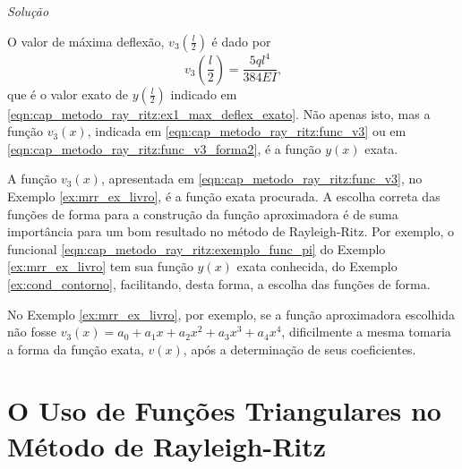 \documentclass[
	12pt,				%
	openright,			%
    twoside,			%
	a4paper,			%
	english,			%
	french,				%
	spanish,			%
	brazil				%
	]{abntex2}
\makeatletter
\renewenvironment{proof}[1][\proofname]{
	\par\pushQED{\qed}%
	\normalfont \topsep6\p@\@plus6\p@\relax
	\trivlist
	\item\relax
		{\itshape
			#1\@addpunct{.}}\hspace\labelsep\ignorespaces
}{%
	\popQED\endtrivlist\@endpefalse
}
\newenvironment{solution}{
	\begin{proof}[Solução]
}{%
	\end{proof}
}
\numberwithin{lema}{chapter}
\numberwithin{teorema}{chapter}
\numberwithin{definicao}{chapter}
\numberwithin{exemplo}{chapter}
\numberwithin{figure}{chapter}
\makeatother
\begin{document}
\begin{solution}
	O valor de máxima deflexão, $v_3(\frac{l}{2})$ é dado por
	$$
		v_3(\frac{l}{2})=\frac{5ql^4}{384EI}
		\text{,}
	$$
	que é o valor exato de $y(\frac{l}{2})$ indicado em \eqref{eqn:cap_metodo_ray_ritz:ex1_max_deflex_exato}. Não apenas isto, mas a função $v_3(x)$, indicada em \eqref{eqn:cap_metodo_ray_ritz:func_v3} ou em \eqref{eqn:cap_metodo_ray_ritz:func_v3_forma2}, é a função $y(x)$ exata.
	
	
\end{solution}

A função $v_3(x)$, apresentada em \eqref{eqn:cap_metodo_ray_ritz:func_v3}, no Exemplo \ref{ex:mrr_ex_livro}, é a função exata procurada. A escolha correta das funções de forma para a construção da função aproximadora é de suma importância para um bom resultado no método de Rayleigh-Ritz. Por exemplo, o funcional \eqref{eqn:cap_metodo_ray_ritz:exemplo_func_pi} do Exemplo \ref{ex:mrr_ex_livro} tem sua função $y(x)$ exata conhecida, do Exemplo \ref{ex:cond_contorno}, facilitando, desta forma, a escolha das funções de forma.

No Exemplo \ref{ex:mrr_ex_livro}, por exemplo, se a função aproximadora escolhida não fosse $v_3(x)=a_0+a_1x+a_2x^2+a_3x^3+a_4x^4$, dificilmente a mesma tomaria a forma da função exata, $v(x)$, após a determinação de seus coeficientes.


\section{O Uso de Funções Triangulares no Método de Rayleigh-Ritz}
\label{sec:mrr_triangular}
\end{document}
